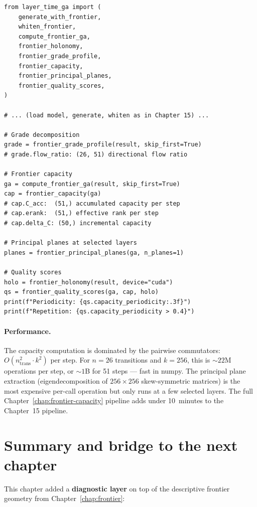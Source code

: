 \documentclass[11pt, twoside, openright]{memoir}
\numberwithin{equation}{chapter}
\begin{document}
\begin{lstlisting}[caption={Frontier capacity pipeline}]
from layer_time_ga import (
    generate_with_frontier,
    whiten_frontier,
    compute_frontier_ga,
    frontier_holonomy,
    frontier_grade_profile,
    frontier_capacity,
    frontier_principal_planes,
    frontier_quality_scores,
)

# ... (load model, generate, whiten as in Chapter 15) ...

# Grade decomposition
grade = frontier_grade_profile(result, skip_first=True)
# grade.flow_ratio: (26, 51) directional flow ratio

# Frontier capacity
ga = compute_frontier_ga(result, skip_first=True)
cap = frontier_capacity(ga)
# cap.C_acc:  (51,) accumulated capacity per step
# cap.erank:  (51,) effective rank per step
# cap.delta_C: (50,) incremental capacity

# Principal planes at selected layers
planes = frontier_principal_planes(ga, n_planes=1)

# Quality scores
holo = frontier_holonomy(result, device="cuda")
qs = frontier_quality_scores(ga, cap, holo)
print(f"Periodicity: {qs.capacity_periodicity:.3f}")
print(f"Repetition: {qs.capacity_periodicity > 0.4}")
\end{lstlisting}

\paragraph{Performance.}
The capacity computation is dominated by the pairwise commutators:
$O(n_{\text{trans}}^2 \cdot k^2)$ per step.  For $n = 26$
transitions and $k = 256$, this is $\sim\!22$M operations per step,
or $\sim\!1$B for 51 steps --- fast in numpy.
The principal plane extraction (eigendecomposition of
$256 \times 256$ skew-symmetric matrices) is the most expensive
per-call operation but only runs at a few selected layers.
The full Chapter~\ref{chap:frontier-capacity} pipeline adds under 10~minutes to the
Chapter~15 pipeline.


\section{Summary and bridge to the next chapter}
\label{sec:cap-summary}

This chapter added a \textbf{diagnostic layer} on top of the
descriptive frontier geometry from Chapter~\ref{chap:frontier}:
\end{document}
